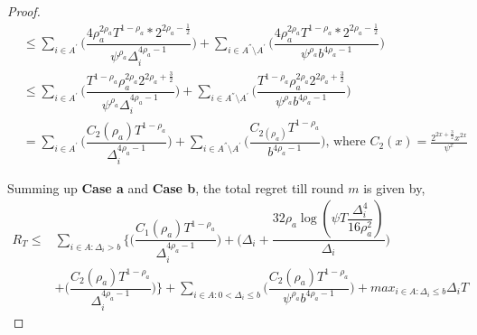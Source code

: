 \begin{proof}
\begin{align*}
&\leq\sum_{i\in A^{'}}\bigg(\dfrac{4\rho_{a}^{2\rho_{a}}T^{1-\rho_{a}}*2^{2\rho_{a}-\frac{1}{2}}}{\psi^{\rho_{a}}\Delta_{i}^{4\rho_{a}-1}} \bigg)+\sum_{i\in A^{''}\setminus A^{'}}\bigg(\dfrac{4\rho_{a}^{2\rho_{a}}T^{1-\rho_{a}}*2^{2\rho_{a}-\frac{1}{2}}}{\psi^{\rho_{a}}b^{4\rho_{a}-1}} \bigg)\\
&\leq\sum_{i\in A^{'}}\bigg(\dfrac{T^{1-\rho_{a}}\rho_{a}^{2\rho_{a}}2^{2\rho_{a}+\frac{3}{2}}}{\psi^{\rho_{a}}\Delta_{i}^{4\rho_{a}-1}} \bigg)+\sum_{i\in A^{''}\setminus A^{'}}\bigg(\dfrac{T^{1-\rho_{a}}\rho_{a}^{2\rho_{a}}2^{2\rho_{a}+\frac{3}{2}}}{\psi^{\rho_{a}}b^{4\rho_{a}-1}} \bigg)\\
& = \sum_{i\in A^{'}}\bigg(\dfrac{ C_{2}(\rho_{a}) T^{1-\rho_{a}}}{\Delta_{i}^{4\rho_{a}-1}} \bigg)+\sum_{i\in A^{''}\setminus A^{'}}\bigg(\dfrac{C_{2(\rho_{a})}T^{1-\rho_{a}}}{b^{4\rho_{a}-1}} \bigg) \text{, where } C_2(x) = \frac{2^{2x+\frac{3}{2}}x^{2x}}{\psi^{x}}
\end{align*}


 
Summing up \textbf{Case a} and \textbf{Case b}, the total regret till round $m$ is given by,
\begin{align*}
 R_{T} \leq &\sum\limits_{i\in A:\Delta_{i} > b}\bigg\lbrace\bigg(\dfrac{C_{1}(\rho_{a})T^{1-\rho_{a}}}{\Delta_{i}^{4\rho_{a}-1}}\bigg) + \bigg(\Delta_{i}+\dfrac{32\rho_{a}\log{(\psi  T\dfrac{\Delta_{i}^{4}}{16\rho_{a}^{2}})}}{\Delta_{i}}\bigg)\\
&  +  \bigg(\dfrac{C_{2}(\rho_{a})T^{1-\rho_{a}}}{\Delta_{i}^{4\rho_{a} -1}} \bigg) \bigg \rbrace+\sum\limits_{i\in A:0 < \Delta_{i}\leq b}\bigg(\dfrac{C_{2}(\rho_{a})T^{1-\rho_{a}}}{\psi^{\rho_{a}}b^{4\rho_{a} -1}} \bigg) + max_{i\in A:\Delta_{i}\leq b}\Delta_{i}T
\end{align*}

  
\end{proof}


